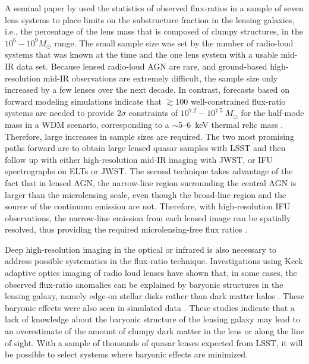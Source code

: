 A seminal paper by \cite{Dalal:2002aa} used the statistics of observed flux-ratios in a sample of seven lens systems to place limits on the substructure fraction in the lensing galaxies, i.e., the percentage of the lens mass that is composed of clumpy structures, in the $10^6 - 10^9 M_\odot$ range.
The small sample size was set by the number of radio-loud systems that was known at the time and the one lens system with a usable mid-IR data set.  
Because lensed radio-loud AGN are rare, and ground-based high-resolution mid-IR observations are extremely difficult, the sample size only increased by a few lenses over the next decade.  
In contrast, forecasts based on forward modeling simulations indicate that $\gtrsim$100 well-constrained flux-ratio systems are needed to provide 2$\sigma$ constraints of $10^{7.2} - 10^{7.5}~M_\odot$ for the half-mode mass in a WDM scenario, corresponding to a $\sim$5--6~keV thermal relic mass \citep{Gilman++18}.
Therefore, large increases in sample sizes are required.
The two most promising paths forward are to obtain large lensed quasar samples with LSST and then follow up with either high-resolution mid-IR imaging with JWST, or IFU spectrographs on ELTs or JWST.  The second technique takes advantage of the fact that in lensed AGN, the narrow-line region surrounding the central AGN is larger than the microlensing scale, even though the broad-line region and the source of the continuum emission are not.  Therefore, with high-resolution IFU observations, the narrow-line emission from each lensed image can be spatially resolved, thus providing the required microlensing-free flux ratios \citep{MoustakasMetcalf03, Nierenberg++14, Nierenberg:2017vlg}.

Deep high-resolution imaging in the optical or infrared is also necessary to address possible systematics in the flux-ratio technique.  
Investigations using Keck adaptive optics imaging of radio loud lenses have shown that, in some cases, the observed flux-ratio anomalies can be explained by baryonic structures in the lensing galaxy, namely edge-on stellar disks rather than dark matter halos \citep{Hsueh++2016, Hsueh++2017}.
These baryonic effects were also seen in simulated data \citep{Gilman++2017, Hsueh++2018}.
These studies indicate that a lack of knowledge about the baryonic structure of the lensing galaxy may lead to an overestimate of the amount of clumpy dark matter in the lens or along the line of sight.
With a sample of thousands of quasar lenses expected from LSST, it will be possible to select systems where baryonic effects are minimized.

